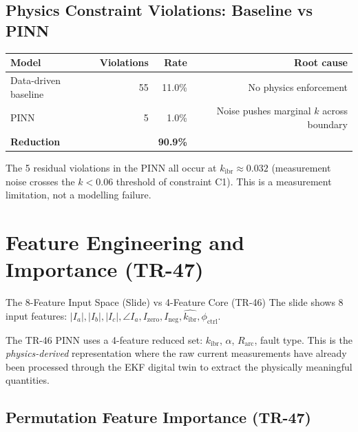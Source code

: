 \documentclass[12pt,a4paper]{article}
\newcommand{\kibr}{k_\mathrm{ibr}}
\begin{document}
\subsection{Physics Constraint Violations: Baseline vs PINN}

\begin{center}
\begin{tabular}{@{}lrrr@{}}
\toprule
\textbf{Model} & \textbf{Violations} & \textbf{Rate} & \textbf{Root cause} \\
\midrule
Data-driven baseline & 55 & 11.0\% & No physics enforcement \\
PINN                 &  5 &  1.0\% & Noise pushes marginal $k$ across boundary \\
\midrule
\textbf{Reduction}   &    & \textbf{90.9\%} & \\
\bottomrule
\end{tabular}
\end{center}

The 5 residual violations in the PINN all occur at $\kibr \approx 0.032$ (measurement noise crosses the $k < 0.06$ threshold of constraint C1). This is a measurement limitation, not a modelling failure.

\section{Feature Engineering and Importance (TR-47)}

\begin{keybox}{The 8-Feature Input Space (Slide) vs 4-Feature Core (TR-46)}
The slide shows 8 input features: $|I_a|, |I_b|, |I_c|, \angle I_a, I_\mathrm{zero}, I_\mathrm{neg}, \hat{\kibr}, \phi_\mathrm{ctrl}$.

The TR-46 PINN uses a 4-feature reduced set: $\kibr$, $\alpha$, $R_\mathrm{arc}$, fault type. This is the \textit{physics-derived} representation where the raw current measurements have already been processed through the EKF digital twin to extract the physically meaningful quantities.
\end{keybox}

\subsection{Permutation Feature Importance (TR-47)}
\end{document}
